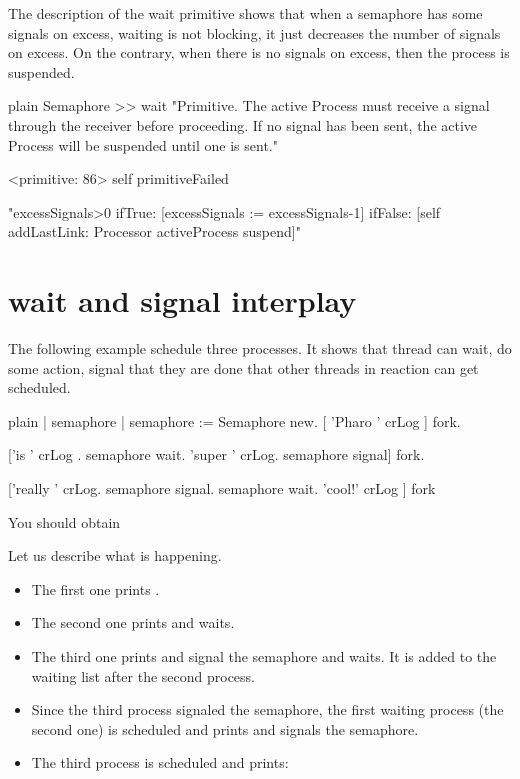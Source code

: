 \documentclass[10pt,twoside,english]{_support/latex/sbabook/sbabook}
\begin{document}
The description of the wait primitive shows that when a semaphore has some signals on excess, waiting is not blocking, it just decreases the number of signals on excess. 
On the contrary, when there is no signals on excess, then the process is suspended.

\begin{displaycode}{plain}
Semaphore >> wait
	"Primitive. The active Process must receive a signal through the receiver 
	before proceeding. If no signal has been sent, the active Process will be 
	suspended until one is sent."

	<primitive: 86>
	self primitiveFailed

	"excessSignals>0  
		ifTrue: [excessSignals := excessSignals-1]  
		ifFalse: [self addLastLink: Processor activeProcess suspend]"
\end{displaycode}
\section{wait and signal interplay}
The following example schedule three processes. It shows that thread can wait, do some action, signal that they are done that other threads in reaction can get scheduled.

\begin{displaycode}{plain}
| semaphore |
semaphore := Semaphore new. 
[ 'Pharo ' crLog ] fork. 

['is ' crLog .
semaphore wait.
'super ' crLog. 
semaphore signal] fork.

['really ' crLog. 
semaphore signal.
semaphore wait.
'cool!' crLog ] fork
\end{displaycode}

You should obtain 

Let us describe what is happening. 

\begin{itemize}
\item The first one prints . 
\item The second one prints  and waits.
\item The third one prints  and signal the semaphore and waits. It is added to the waiting list after the second process.
\item Since the third process signaled the semaphore, the first waiting process (the second one) is scheduled and prints  and signals the semaphore. 
\item The third process is scheduled and prints: 
\end{itemize}
\end{document}
